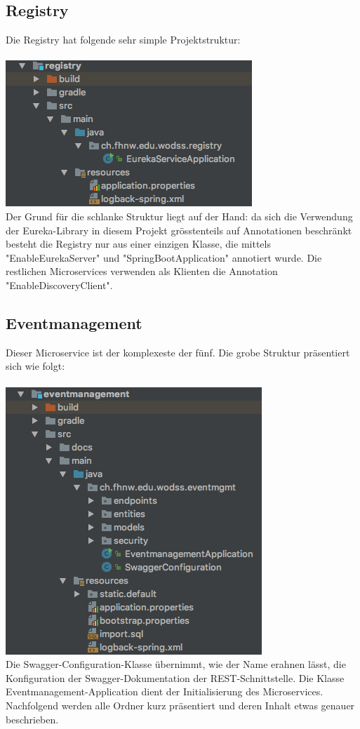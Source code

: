 \documentclass[11pt]{article} %
\begin{document}
\subsection{Registry}
Die Registry hat folgende sehr simple Projektstruktur:
\\
\\
\includegraphics[scale=0.7]{structure_registry}
\\
Der Grund für die schlanke Struktur liegt auf der Hand: da sich die Verwendung der Eureka-Library in diesem Projekt grösstenteils auf Annotationen beschränkt besteht die Registry nur aus einer einzigen Klasse, die mittels "EnableEurekaServer" und "SpringBootApplication" annotiert wurde. Die restlichen Microservices verwenden als Klienten die Annotation "EnableDiscoveryClient".

\subsection{Eventmanagement}
Dieser Microservice ist der komplexeste der fünf. Die grobe Struktur präsentiert sich wie folgt:
\\
\\
\includegraphics[scale=0.7]{structure_eventmanagement}
\\
Die Swagger-Configuration-Klasse übernimmt, wie der Name erahnen lässt, die Konfiguration der Swagger-Dokumentation der REST-Schnittstelle. Die Klasse Eventmanagement-Application dient der Initialisierung des Microservices. Nachfolgend werden alle Ordner kurz präsentiert und deren Inhalt etwas genauer beschrieben.
\\
\end{document}
